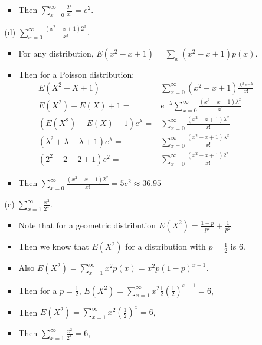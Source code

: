 \documentclass{article}
\begin{document}
\begin{enumerate}
\begin{enumerate}
\begin{itemize}
        \item Then $\sum_{x=0}^{\infty} \frac{2^x}{x!} = e^2$.
        \end{itemize}
    \item [(d)] $\sum_{x=0}^{\infty}\frac{(x^2-x+1)2^x}{x!}$.
        \begin{itemize}
        \item For any distribution, $E(x^2 - x + 1) = \sum_{x} (x^2 - x + 1)p(x)$.
        \item Then for a Poisson distribution:
        \begin{equation*}
        \begin{aligned}
            E(X^2 - X + 1) =& \sum_{x=0}^{\infty} (x^2 - x + 1) \frac{\lambda^x e^{-\lambda}}{x!} \\
            E(X^2) - E(X) + 1 =& e^{-\lambda} \sum_{x=0}^{\infty} \frac{(x^2 - x + 1) \lambda^x}{x!} \\
            (E(X^2) - E(X) + 1)e^{\lambda} =&  \sum_{x=0}^{\infty} \frac{(x^2 - x + 1) \lambda^x}{x!} \\
            (\lambda^2 + \lambda - \lambda + 1)e^{\lambda} =& \sum_{x=0}^{\infty} \frac{(x^2 - x + 1) \lambda^x}{x!} \\
            (2^2 + 2 - 2 + 1)e^2 =& \sum_{x=0}^{\infty} \frac{(x^2 - x + 1) 2^x}{x!}
        \end{aligned}
        \end{equation*}
        \item Then $\sum_{x=0}^{\infty}\frac{(x^2-x+1)2^x}{x!} = 5e^2 \approx 36.95$
        \end{itemize}
    \item [(e)] $\sum_{x=1}^{\infty}\frac{x^2}{2^x}$.
        \begin{itemize}
        \item Note that for a geometric distribution $E(X^2) = \frac{1-p}{p^2} + \frac{1}{p^2}$.
        \item Then we know that $E(X^2)$ for a distribution with $p = \frac{1}{2}$ is $6$.
        \item Also $E(X^2) = \sum_{x=1}^{\infty} x^2 p(x) = x^2 p(1-p)^{x-1}$.
        \item Then for a $p = \frac{1}{2}$, $E(X^2) = \sum_{x=1}^{\infty} x^2 \frac{1}{2}(\frac{1}{2})^{x-1}= 6$,
        \item Then $E(X^2) = \sum_{x=1}^{\infty} x^2 (\frac{1}{2})^x = 6$,
        \item Then $\sum_{x=1}^{\infty} \frac{x^2}{2^x} = 6$,
        \end{itemize}
    \end{enumerate}
\end{enumerate}
\end{document}
